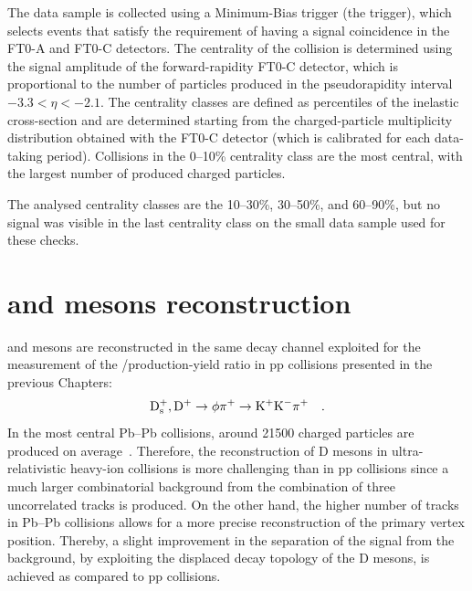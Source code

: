 The data sample is collected using a Minimum-Bias trigger (the  trigger), which selects events that satisfy the requirement of having a signal coincidence in the FT0-A and FT0-C detectors. The centrality of the collision is determined using the signal amplitude of the forward-rapidity FT0-C detector, which is proportional to the number of particles produced in the pseudorapidity interval $-3.3<\eta<-2.1$. The centrality classes are defined as percentiles of the inelastic cross-section and are determined starting from the charged-particle multiplicity distribution obtained with the FT0-C detector (which is calibrated for each data-taking period). Collisions in the 0--10\% centrality class are the most central, with the largest number of produced charged particles.

The analysed centrality classes are the 10--30\%, 30--50\%, and 60--90\%, but no signal was visible in the last centrality class on the small data sample used for these checks. 


\section{\texorpdfstring{\ds and \dpl mesons reconstruction}{Ds+ and D+ mesons reconstruction}}
\ds and \dpl mesons are reconstructed in the same decay channel exploited for the measurement of the \ds/\dpl production-yield ratio in pp collisions presented in the previous Chapters: 
\begin{equation*}
    \mathrm{D_s^+}, \mathrm{D^+} \rightarrow \mathrm{\phi\pi^+ \rightarrow K^+K^-\pi^+}\quad .
\end{equation*} 
In the most central Pb--Pb collisions, around 21500 charged particles are produced on average~\cite{ALICE:2016fbt}. Therefore, the reconstruction of D mesons in ultra-relativistic heavy-ion collisions is more challenging than in pp collisions since a much larger combinatorial background from the combination of three uncorrelated tracks is produced. On the other hand, the higher number of tracks in Pb--Pb collisions allows for a more precise reconstruction of the primary vertex position. Thereby, a slight improvement in the separation of the signal from the background, by exploiting the displaced decay topology of the D mesons, is achieved as compared to pp collisions.


